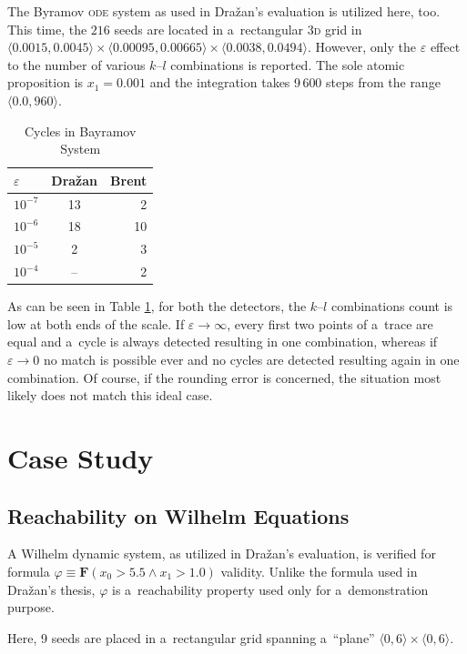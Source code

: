 \documentclass[12pt,twoside,draft]{fithesis}
\newcommand{\bF}{\mathbf{F}}
\begin{document}
The Byramov \textsc{ode} system as used in Dra\v{z}an's evaluation is
utilized here, too. This time, the $216$ seeds are located in
a~rectangular \textsc{3d} grid in
$\langle 0.0015,0.0045\rangle\times\langle 0.00095,0.00665
\rangle\times\langle 0.0038,0.0494\rangle$.
However, only the $\varepsilon$
effect to the number of various $k$--$l$ combinations is reported.
The sole atomic proposition is $x_1=0.001$ and the integration takes
9\,600 steps from the range $\langle 0.0,960\rangle$.
\begin{table}[h]
\label{tab:by}
\begin{tabular}{l | c r}
	$\varepsilon$ &Dra\v{z}an &Brent\\
	\hline
	$10^{-7}$ &13 &2\\
	$10^{-6}$ &18 &10\\
	$10^{-5}$ &2 &3\\
	$10^{-4}$ &-- &2\\
\end{tabular}
\caption{Cycles in Bayramov System}
\end{table}

As can be seen in Table \ref{tab:by}, for both the detectors,
the $k$--$l$ combinations count is low at both ends of the scale. If
$\varepsilon\rightarrow\infty$, every first two points of a~trace are
equal and a~cycle is always detected resulting in one combination,
whereas if $\varepsilon\rightarrow0$ no match is possible ever and no
cycles are detected resulting again in one combination. Of course, if
the rounding error is concerned, the situation most likely does not
match this ideal case.

\section{Case Study}
\subsection*{Reachability on Wilhelm Equations}
A Wilhelm dynamic system, as utilized in Dra\v{z}an's
evaluation\cite{sven}, is verified for formula
$\varphi\equiv\bF(x_0>5.5\wedge x_1>1.0)$ validity. Unlike the formula
used in Dra\v{z}an's thesis, $\varphi$ is a~reachability property used
only for a~demonstration purpose.

Here, 9 seeds are placed in a~rectangular grid spanning a~``plane''
$\langle0,6\rangle\times\langle0,6\rangle$.
\end{document}
